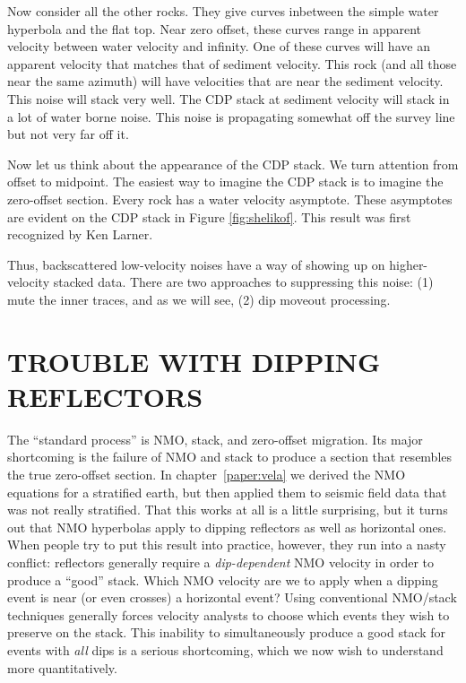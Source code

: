 \par
Now consider all the other rocks.
They give curves inbetween the simple water hyperbola and the flat top.
Near zero offset, these curves range in apparent velocity
between water velocity and infinity.
One of these curves will have an apparent velocity that matches
that of sediment velocity.
This rock (and all those near the same azimuth)
will have velocities that are near the sediment velocity.
This noise will stack very well.
The CDP stack at sediment velocity will stack
in a lot of water borne noise.
This noise is propagating somewhat off the survey line
but not very far off it.

\par
Now let us think about the appearance of the CDP stack.
We turn attention from offset to midpoint.
The easiest way to imagine the CDP stack
is to imagine the zero-offset section.
Every rock has a water velocity asymptote.
These asymptotes are evident on
the CDP stack in Figure \ref{fig:shelikof}.
This result was first recognized by Ken Larner.

\par
Thus, backscattered low-velocity noises have
a way of showing up on higher-velocity stacked data.
There are two approaches
to suppressing this noise:
(1) mute the inner traces,
and as we will see,
(2) dip moveout processing.


\section{TROUBLE WITH DIPPING REFLECTORS}
\par
The ``standard process'' is NMO, stack, and zero-offset migration.
Its major shortcoming is the failure of NMO and stack
to produce a section that resembles the true zero-offset section.
In chapter~\ref{paper:vela} we derived
the NMO equations for a stratified earth,
but then applied them to seismic field data 
that was not really stratified.
That this works at all is a little surprising,
but it turns out that NMO hyperbolas
apply to dipping reflectors as well as horizontal ones.
When people try to put this result into practice,
however,
they run into a nasty conflict:
reflectors generally require a {\em dip-dependent}
NMO velocity in order to produce a ``good'' stack.
Which NMO velocity are we to apply
when a dipping event is near (or even crosses) a horizontal event?  
Using conventional NMO/stack techniques
generally forces velocity analysts to choose
which events they wish to preserve on the stack.
This inability to simultaneously produce a good stack
for events with {\em all} dips is a serious shortcoming,
which we now wish to understand more quantitatively.

